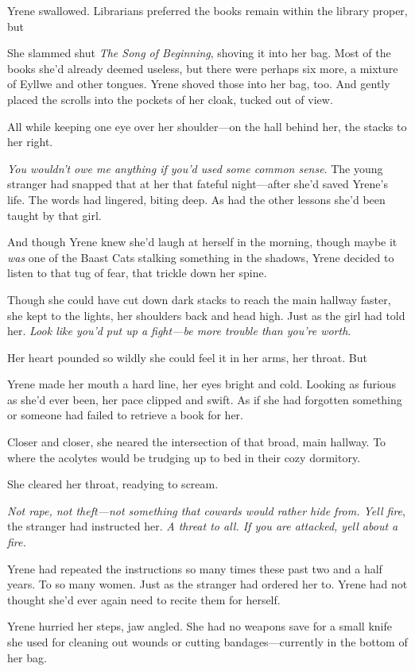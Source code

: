 Yrene swallowed. Librarians preferred the books remain within the library proper, but 

She slammed shut \emph{The Song of Beginning}, shoving it into her bag. Most of the books she'd already deemed useless, but there were perhaps six more, a mixture of Eyllwe and other tongues. Yrene shoved those into her bag, too. And gently placed the scrolls into the pockets of her cloak, tucked out of view.

All while keeping one eye over her shoulder---on the hall behind her, the stacks to her right.

\emph{You wouldn't owe me anything if you'd used some common sense}. The young stranger had snapped that at her that fateful night---after she'd saved Yrene's life. The words had lingered, biting deep. As had the other lessons she'd been taught by that girl.

And though Yrene knew she'd laugh at herself in the morning, though maybe it \emph{was} one of the Baast Cats stalking something in the shadows, Yrene decided to listen to that tug of fear, that trickle down her spine.

Though she could have cut down dark stacks to reach the main hallway faster, she kept to the lights, her shoulders back and head high. Just as the girl had told her. \emph{Look like you'd put up a fight---be more trouble than you're worth}.

Her heart pounded so wildly she could feel it in her arms, her throat. But

Yrene made her mouth a hard line, her eyes bright and cold. Looking as furious as she'd ever been, her pace clipped and swift. As if she had forgotten something or someone had failed to retrieve a book for her.

Closer and closer, she neared the intersection of that broad, main hallway. To where the acolytes would be trudging up to bed in their cozy dormitory.

She cleared her throat, readying to scream.

\emph{Not rape, not theft---not something that cowards would rather hide from. Yell fire}, the stranger had instructed her. \emph{A threat to all. If you are attacked, yell about a fire.}

Yrene had repeated the instructions so many times these past two and a half years. To so many women. Just as the stranger had ordered her to. Yrene had not thought she'd ever again need to recite them for herself.

Yrene hurried her steps, jaw angled. She had no weapons save for a small knife she used for cleaning out wounds or cutting bandages---currently in the bottom of her bag.

